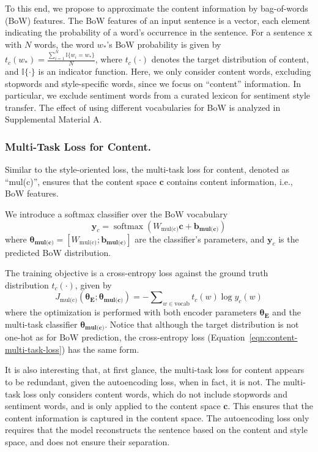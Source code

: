 \documentclass[letterpaper]{article} %
\newcommand{\rmx}{\mathrm x}
\newcommand{\loss}[1]{J_{\text{#1}}}
\newcommand{\nnweight}[1]{\bm{\theta_{\text{#1}}}}
\newcommand{\weight}[1]{W_{\text{#1}}}
\newcommand{\bias}[1]{\bm{b_{\text{#1}}}}
\begin{document}
To this end, we propose to approximate the content information by bag-of-words (BoW) features.
The BoW features of an input sentence is a vector, each element indicating the probability of a word's occurrence in the sentence.
For a sentence $\rmx$ with $N$ words, the word $w_*$'s BoW probability is given by
$t_c(w_*)=\frac{\sum_{i=1}^{N}{\mathbb{I}\{w_i = w_*\}}}{N}$,
where $t_c(\cdot)$ denotes the target distribution of content, and $\mathbb{I\{\cdot\}}$ is an indicator function.
Here, we only consider content words, excluding stopwords and style-specific words, since we focus on ``content'' information. In particular, we exclude sentiment words from a curated lexicon \cite{hu2004mining} for sentiment style transfer.
The effect of using different vocabularies for BoW is analyzed in Supplemental Material A.

\subsubsection{Multi-Task Loss for Content.} \label{ssec:multitask-content-objective}

Similar to the style-oriented loss, the multi-task loss for content, denoted as ``mul(c)'', ensures that the content space $\bm c$ contains content information, i.e., BoW features.

We introduce a softmax classifier over the BoW vocabulary
\begin{equation} \label{eqn:bow-pred}
	\bm y_c = \operatorname{softmax}({\weight{mul(c)}} \bm c + \bias{mul(c)})
\end{equation}
where $\nnweight{mul(c)}=[\weight{mul(c)}; \bias{mul(c)}]$ are the classifier's parameters, and $\bm y_c$ is the predicted BoW distribution.

The training objective is a cross-entropy loss against the ground truth distribution $t_c(\cdot)$, given by
\begin{equation}\label{eqn:content-multi-task-loss}
	\loss{mul(c)}(\nnweight{E};\nnweight{mul(c)}) = - \sum\nolimits_{w\in\text{vocab}} t_c(w)\log y_c(w)
\end{equation}
where the optimization is performed with both encoder parameters $\nnweight{E}$ and the multi-task classifier $\nnweight{mul(c)}$.
Notice that although the target distribution is not one-hot as for BoW prediction, the cross-entropy loss (Equation~\ref{eqn:content-multi-task-loss}) has the same form.

It is also interesting that, at first glance, the multi-task loss for content appears to be redundant, given the autoencoding loss, when in fact, it is not. The multi-task loss only considers content words, which do not include stopwords and sentiment words, and is only applied to the content space $\bm c$. This ensures that the content information is captured in the content space. The autoencoding loss only requires that the model reconstructs the sentence based on the content and style space, and does not ensure their separation.
\end{document}
